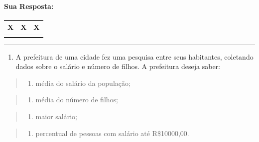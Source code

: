 \documentclass[12pt,a4paper]{article}
\renewcommand{\linethickness}{0.05em}
\providecommand{\tightlist}{%
      \setlength{\itemsep}{0pt}\setlength{\parskip}{0pt}}
\begin{document}
    \hypertarget{sua-resposta}{%
\paragraph{Sua Resposta:}\label{sua-resposta}}

\begin{longtable}[]{@{}ccc@{}}
\toprule
X & X & X\tabularnewline
\midrule
\endhead
& &\tabularnewline
\bottomrule
\end{longtable}

    \begin{center}\rule{0.5\linewidth}{\linethickness}\end{center}

\begin{enumerate}
\def\labelenumi{\arabic{enumi}.}
\setcounter{enumi}{4}
\tightlist
\item
  A prefeitura de uma cidade fez uma pesquisa entre seus habitantes,
  coletando dados sobre o salário e número de filhos. A prefeitura
  deseja saber:
\end{enumerate}

\begin{quote}
\begin{enumerate}
\def\labelenumi{\alph{enumi})}
\tightlist
\item
  média do salário da população;
\end{enumerate}
\end{quote}

\begin{quote}
\begin{enumerate}
\def\labelenumi{\alph{enumi})}
\setcounter{enumi}{1}
\tightlist
\item
  média do número de filhos;
\end{enumerate}
\end{quote}

\begin{quote}
\begin{enumerate}
\def\labelenumi{\alph{enumi})}
\setcounter{enumi}{2}
\tightlist
\item
  maior salário;
\end{enumerate}
\end{quote}

\begin{quote}
\begin{enumerate}
\def\labelenumi{\alph{enumi})}
\setcounter{enumi}{3}
\tightlist
\item
  percentual de pessoas com salário até R\$10000,00.
\end{enumerate}
\end{quote}
\end{document}
